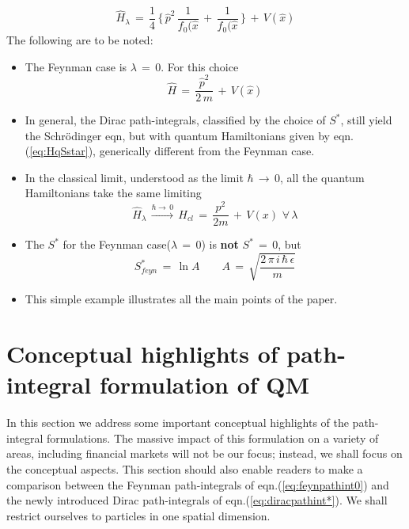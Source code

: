 \documentclass[a4paper]{JHEP3}
\newcommand{\be}{\begin{equation}}
\newcommand{\ee}{\end{equation}}
\begin{document}
\be
\label{eq:HqSstar}
{\hat H}_{\lambda}\,=\,\frac{1}{4}\,\{\,{\hat p}^2\,\frac{1}{f_0({\hat x}}\,+\,\frac{1}{f_0({\hat x}}\,\}\,+\,V({\hat x})
\ee
The following are to be noted:
\begin{itemize}
\item The Feynman case is $\lambda\,=\,0$. For this choice
\be
\label{Hqfeyn}
{\hat H}\,=\,\frac{{\hat p}^2}{2\,m}\,+\,V({\hat x})
\ee
\item In general, the Dirac path-integrals, classified by the choice of $S^*$, still yield the Schr\"odinger eqn, but with quantum 
Hamiltonians given by eqn.(\ref{eq:HqSstar}), generically different from the Feynman case.
\item In the classical limit, understood as the limit $\hbar\,\rightarrow\,0$, all the quantum Hamiltonians take the same limiting
\be
\label{eq:Hcl}
{\hat H}_{\lambda}\,\xrightarrow{\hbar\rightarrow\,0}\,H_{cl}\,=\,\frac{p^2}{2m}\,+\,V(x)\,\,\forall\,\lambda
\ee
\item The $S^*$ for the Feynman case($\lambda\,=\,0$) is {\bf not} $S^*\,=\,0$, but
\be
S^*_{feyn}\,=\,\ln{A}\quad\quad A\,=\,\sqrt{\frac{2\,\pi\,i\,\hbar\,\epsilon}{m}}
\ee
\item This simple example illustrates all the main points of the paper.
\end{itemize}
\section{Conceptual highlights of path-integral formulation of QM}
\label{sec:highlights}
In this section we address some important conceptual highlights of the path-integral formulations. The massive impact of this formulation 
on a variety of
areas, including financial markets \cite{kleinert} will not be our focus; instead, we shall focus on the conceptual aspects. 
This section should also enable readers to make a comparison between the Feynman path-integrals of eqn.(\ref{eq:feynpathint0}) and the newly
introduced Dirac path-integrals of eqn.(\ref{eq:diracpathint*}). 
We shall restrict ourselves to particles in one spatial dimension. 
\end{document}

